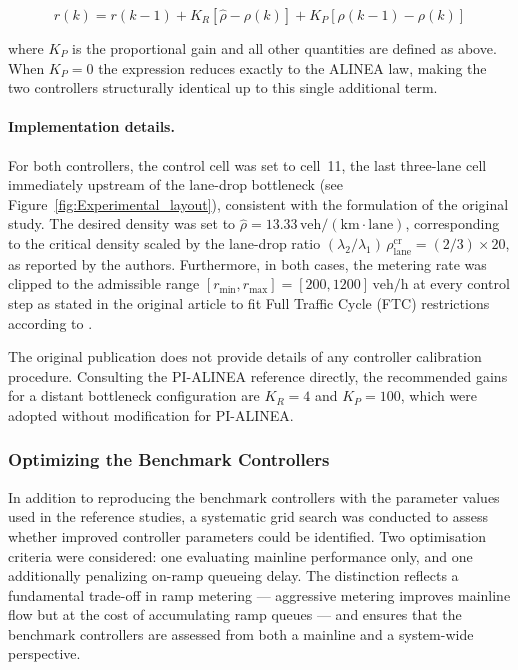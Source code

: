 \begin{equation}
    r(k) = r(k-1) + K_R\!\left[\hat{\rho} - \rho(k)\right]
                  + K_P\!\left[\rho(k-1) - \rho(k)\right]
\end{equation}

where $K_P$ is the proportional gain and all other quantities are defined as
above. When $K_P = 0$ the expression reduces exactly to the ALINEA law,
making the two controllers structurally identical up to this single additional
term.

\paragraph{Implementation details.}

For both controllers, the control cell was set to cell~11, the last three-lane
cell immediately upstream of the lane-drop bottleneck
(see Figure~\ref{fig:Experimental_layout}), consistent with the formulation
of the original study. The desired density was set to
$\hat{\rho} = 13.33\,\mathrm{veh/(km{\cdot}lane)}$, corresponding to the
critical density scaled by the lane-drop ratio
$(\lambda_2/\lambda_1)\,\rho^{\mathrm{cr}}_{\mathrm{lane}} = (2/3)\times 20$,
as reported by the authors. Furthermore, in both cases, the metering rate was clipped to the admissible
range $[r_{\min}, r_{\max}] = [200, 1200]\,\mathrm{veh/h}$ at every control
step as stated in the original article to fit Full Traffic Cycle (FTC) restrictions according to \cite{Full_Traffic_Cycle}.

The original publication does not provide details of any controller
calibration procedure. Consulting the PI-ALINEA reference \citep{PI-ALINEA}
directly, the recommended gains for a distant bottleneck configuration are
$K_R = 4$ and $K_P = 100$, which were adopted without modification for
PI-ALINEA.


\subsubsection{Optimizing the Benchmark Controllers}

In addition to reproducing the benchmark controllers with the parameter values
used in the reference studies, a systematic grid search was conducted to assess
whether improved controller parameters could be identified. Two optimisation
criteria were considered: one evaluating mainline performance only, and one
additionally penalizing on-ramp queueing delay. The distinction reflects a
fundamental trade-off in ramp metering — aggressive metering improves mainline
flow but at the cost of accumulating ramp queues — and ensures that the
benchmark controllers are assessed from both a mainline and a system-wide
perspective.

